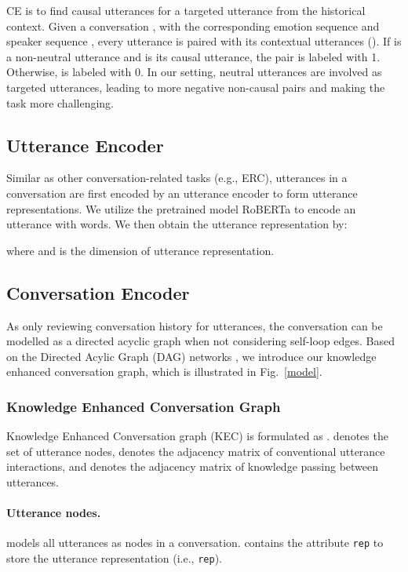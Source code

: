 \documentclass{article}
\begin{document}
CE is to find causal utterances for a targeted utterance from the historical context. Given a conversation , with the corresponding emotion sequence  and speaker sequence  , every utterance  is paired with its contextual utterances  (). If  is a non-neutral utterance and  is its causal utterance, the pair  is labeled with 1. Otherwise,  is labeled with 0. In our setting, neutral utterances are involved as targeted utterances, leading to more negative non-causal pairs and making the task more challenging. 

\subsection{Utterance Encoder}

Similar as other conversation-related tasks (e.g., ERC), utterances in a conversation are first encoded by an utterance encoder to form utterance representations.  We utilize the pretrained model RoBERTa \cite{roberta} to encode an utterance  with  words. We then obtain the utterance representation by:

where  and  is the dimension of utterance representation. 

\subsection{Conversation Encoder}

As only reviewing conversation history for utterances, the conversation can be modelled as a directed acyclic graph when not considering self-loop edges. Based on the Directed Acylic Graph (DAG) networks \cite{DAG}, we introduce our knowledge enhanced conversation graph, which is illustrated in Fig.~\ref{model}. 

\subsubsection{Knowledge Enhanced Conversation Graph}

Knowledge Enhanced Conversation graph (KEC) is formulated as .  denotes the set of utterance nodes,  denotes the adjacency matrix of conventional utterance interactions, and  denotes the adjacency matrix of knowledge passing between utterances. 

\paragraph{Utterance nodes.}  models all utterances as nodes  in a conversation.  contains the attribute {\tt rep} to store the utterance representation (i.e., {\tt rep}). 
\end{document}
